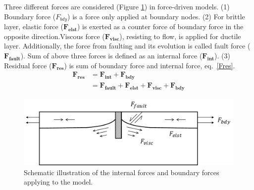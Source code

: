 \documentclass[letterpaper,12pt,notitle]{memphisthesis}                     %
\begin{document}
Three different forces are considered (Figure \ref{fig:forcescheme}) in force-driven models. (1) Boundary force ($F_{bdy}$) is a force only applied at boundary nodes. (2) For brittle layer, elastic force ($\boldsymbol{F_{elst}}$) is exerted as a counter force of boundary force in the opposite direction.Viscous force ($\boldsymbol{F_{visc}}$), resisting to flow, is applied for ductile layer. Additionally, the force from faulting and its evolution is called fault force ($\boldsymbol{F_{fault}}$). Sum of above three forces is defined as an internal force ($\boldsymbol{F_{int}}$). (3) Residual force ($\boldsymbol{F_{res}}$) is sum of boundary force and internal force, eq.~\eqref{Fres}.
%
\begin{align} \label{Fres}
\mathbf{F_{res}} & = \mathbf{F_{int}} + \mathbf{F_{bdy}} \\
 & = \mathbf{F_{fault}} + \mathbf{F_{elst}} + \mathbf{F_{visc}} + \mathbf{F_{bdy}}
\end{align}
%
\begin{figure}[!htb]
	\centering
	\includegraphics[width=0.9\linewidth]{./figs/force.pdf}
	\caption{ Schematic illustration of the internal forces and boundary forces applying to the model.}
	\label{fig:forcescheme}
\end{figure}
\end{document}
